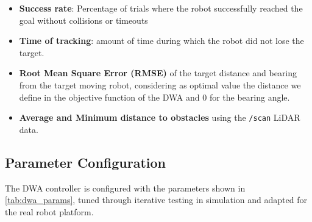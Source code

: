\begin{itemize}
    \item \textbf{Success rate}: Percentage of trials where the robot successfully reached the goal without collisions or timeouts
    \item \textbf{Time of tracking}: amount of time during which the robot did not lose the target. 
    \item \textbf{Root Mean Square Error (RMSE)} of the target distance and bearing from the target moving robot, considering as optimal value the distance we define in the objective function of the DWA and 0 for the bearing angle. 
    \item \textbf{Average and Minimum distance to obstacles} using the \texttt{/scan} LiDAR data. 
\end{itemize}

\subsection{Parameter Configuration}

The DWA controller is configured with the parameters shown in \autoref{tab:dwa_params}, tuned through iterative testing in simulation and adapted for the real robot platform.

